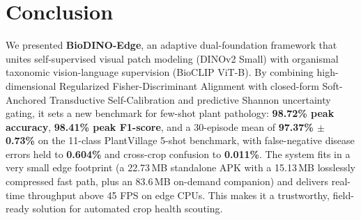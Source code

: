 \documentclass[conference]{IEEEtran}
\begin{document}
\section{Conclusion}
We presented \textbf{BioDINO-Edge}, an adaptive dual-foundation framework that unites self-supervised visual patch modeling (DINOv2 Small) with organismal taxonomic vision-language supervision (BioCLIP ViT-B). By combining high-dimensional Regularized Fisher-Discriminant Alignment with closed-form Soft-Anchored Transductive Self-Calibration and predictive Shannon uncertainty gating, it sets a new benchmark for few-shot plant pathology: \textbf{98.72\% peak accuracy}, \textbf{98.41\% peak F1-score}, and a 30-episode mean of \textbf{97.37\% $\pm$ 0.73\%} on the 11-class PlantVillage 5-shot benchmark, with false-negative disease errors held to \textbf{0.604\%} and cross-crop confusion to \textbf{0.011\%}. The system fits in a very small edge footprint (a 22.73\,MB standalone APK with a 15.13\,MB losslessly compressed fast path, plus an 83.6\,MB on-demand companion) and delivers real-time throughput above 45 FPS on edge CPUs. This makes it a trustworthy, field-ready solution for automated crop health scouting.

\makeatletter
\def\thebibliography#1{\section*{\refname}%
    \addcontentsline{toc}{section}{\refname}%
    \scriptsize\vskip 0.2\baselineskip%
    \list{\@biblabel{\@arabic\c@enumiv}}%
    {\settowidth\labelwidth{\@biblabel{#1}}%
    \leftmargin\labelwidth
    \advance\leftmargin\labelsep\relax
    \itemsep 0.5pt\relax
    \parsep 0pt\relax
    \usecounter{enumiv}%
    \let\p@enumiv\@empty
    \renewcommand\theenumiv{\@arabic\c@enumiv}}%
    \let\@IEEElatexbibitem\bibitem%
    \def\bibitem{\@IEEEbibitemprefix\@IEEElatexbibitem}%
\def\newblock{\hskip .11em plus .33em minus .07em}}
\makeatother



\end{document}
